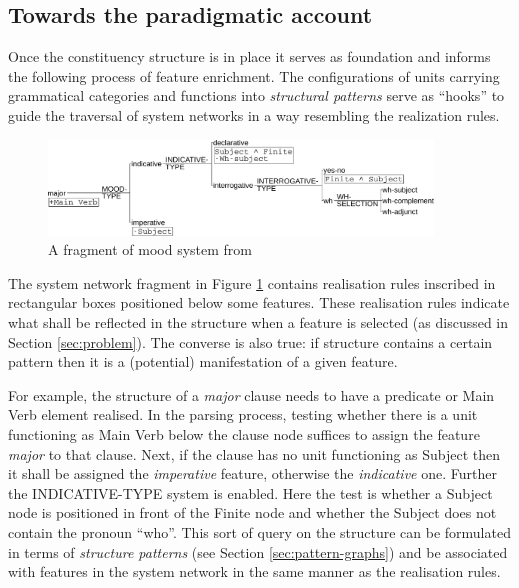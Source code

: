 
\subsection{Towards the paradigmatic account}
\label{sec:paradigmatic-account}
Once the constituency structure is in place it serves as foundation and informs the following process of feature enrichment. The configurations of units carrying grammatical categories and functions into \textit{structural patterns} serve as ``hooks'' to guide the traversal of system networks in a way resembling the realization rules. %

\begin{figure}[!ht]
    \centering      
    \includegraphics[width=0.91\textwidth]{Figures/Example/just-mood.pdf}      
    \caption{A fragment of mood system from \citet[366]{Halliday2013}}
    \label{fig:just-mood}
\end{figure}

The system network fragment in Figure \ref{fig:just-mood} contains realisation rules inscribed in rectangular boxes positioned below some features. These realisation rules indicate what shall be reflected in the structure when a feature is selected (as discussed in Section \ref{sec:problem}). The converse is also true: if structure contains a certain pattern then it is a (potential) manifestation of a given feature. 

For example, the structure of a \textit{major} clause needs to have a predicate or Main Verb element realised. In the parsing process, testing whether there is a unit functioning as Main Verb below the clause node suffices to assign the feature \textit{major} to that clause. Next, if the clause has no unit functioning as Subject then it shall be assigned the \textit{imperative} feature, otherwise the \textit{indicative} one. Further the INDICATIVE-TYPE system is enabled. Here the test is whether a Subject node is positioned in front of the Finite node and whether the Subject does not contain the pronoun ``who''. This sort of query on the structure can be formulated in terms of \textit{structure patterns} (see Section \ref{sec:pattern-graphs}) and be associated with features in the system network in the same manner as the realisation rules. 


